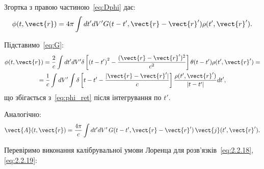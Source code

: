 Згортка з правою частиною~\eqref{eq:Dphi} дає:
\begin{equation}\label{eq:2.2.18}
	\phi (t, \vect{r}) = 4\pi \int dt' dV' G(t - t', \vect{r} - \vect{r}') \rho (t', \vect{r}').
\end{equation}

Підставимо~\eqref{eq:G}:
\begin{multline*}
	\phi (t, \vect{r}) = \frac2c \int dt' dV' \delta \left[ \left( t - t' \right)^2 - \frac{(\vect{r} - \vect{r}')^2}{c^2} \right] \theta (t - t') \rho (t',
	\vect{r}') = \\
	= \frac{1}{c} \int dV' \int \delta \left[ t - t' - \frac{|\vect{r} - \vect{r}'|}{c} \right] \frac{\rho (t', \vect{r}')}{|t - t'|} dt',
\end{multline*}
що збігається з~\eqref{eq:phi_ret} після інтегрування по $t'$.

Аналогічно:
\begin{equation}\label{eq:2.2.19}
	\vect{A} (t, \vect{r}) = \frac{4\pi}{c} \int dt' dV' \, G(t - t', \vect{r} - \vect{r}') \, \vect{j} (t', \vect{r}').
\end{equation}

Перевіримо виконання калібрувальної умови Лоренца для розв'язків~\eqref{eq:2.2.18}, \eqref{eq:2.2.19}:

